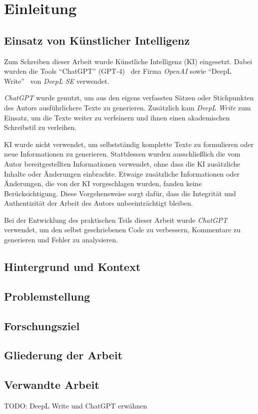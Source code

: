\chapter{Einleitung}
\section{Einsatz von Künstlicher Intelligenz} %
Zum Schreiben dieser Arbeit wurde Künstliche Intelligenz (KI) eingesetzt.
Dabei wurden die Tools \enquote{ChatGPT} (GPT-4)~\cite{openai_chatgpt_nodate} der Firma \emph{OpenAI} sowie \enquote{DeepL Write}~\cite{deepl_se_deepl_nodate} von \emph{DeepL SE} verwendet.

\emph{ChatGPT} wurde genutzt, um aus den eigens verfassten Sätzen oder Stichpunkten des Autors ausführlichere Texte zu generieren.
Zusätzlich kam \emph{DeepL Write} zum Einsatz, um die Texte weiter zu verfeinern und ihnen einen akademischen Schreibstil zu verleihen.

KI wurde nicht verwendet, um selbstständig komplette Texte zu formulieren oder neue Informationen zu generieren.
Stattdessen wurden ausschließlich die vom Autor bereitgestellten Informationen verwendet, ohne dass die KI zusätzliche Inhalte oder Änderungen einbrachte.
Etwaige zusätzliche Informationen oder Änderungen, die von der KI vorgeschlagen wurden, fanden keine Berücksichtigung.
Diese Vorgehensweise sorgt dafür, dass die Integrität und Authentizität der Arbeit des Autors unbeeinträchtigt bleiben.

Bei der Entwicklung des praktischen Teils dieser Arbeit wurde \emph{ChatGPT} verwendet, um den selbst geschriebenen Code zu verbessern, Kommentare zu generieren und Fehler zu analysieren.
\section{Hintergrund und Kontext}
\section{Problemstellung}
\section{Forschungsziel}
\section{Gliederung der Arbeit}
\section{Verwandte Arbeit}

 TODO: DeepL Write und ChatGPT erwähnen
 